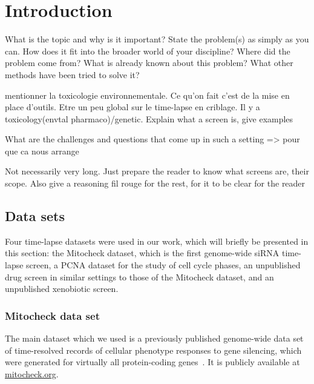 \chapter{Introduction}
What is the topic and why is it important? State the problem(s) as simply as you can. How does it fit into the broader world of your discipline? 
Where did the problem come from? What is already known about this problem? What other methods have been tried to solve it? 


mentionner la toxicologie environnementale. Ce qu'on fait c'est de la mise en place d'outils. Etre un peu global sur le time-lapse en criblage. Il y a toxicology(envtal pharmaco)/genetic. Explain what a screen is, give examples

What are the challenges and questions that come up in such a setting => pour que ca nous arrange

Not necessarily very long. Just prepare the reader to know what screens are, their scope. Also give a reasoning fil rouge for the rest, for it to be clear for the reader
\section{Data sets}
Four time-lapse datasets were used in our work, which will briefly be presented in this section: the Mitocheck dataset, which is the first genome-wide siRNA time-lapse screen, a PCNA dataset for the study of cell cycle phases, an unpublished drug screen in similar settings to those of the Mitocheck dataset, and an unpublished xenobiotic screen.

\subsection{Mitocheck data set}

The main dataset which we used is a previously published genome-wide data set of time-resolved
records of cellular phenotype responses to gene silencing, which
were generated for virtually all protein-coding genes~\cite{pmid20360735}. It is publicly available at
\href{http://www.mitocheck.org}{mitocheck.org}. 


